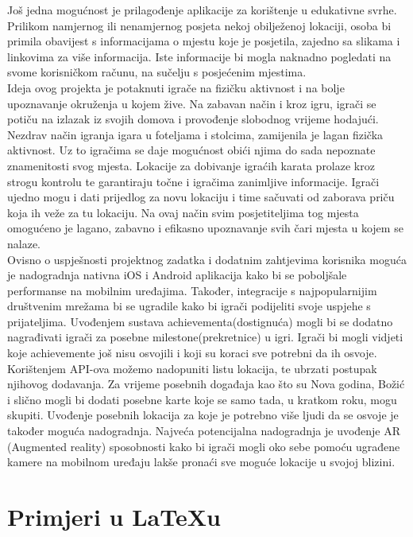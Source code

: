 		\textnormal{Još jedna mogućnost je prilagođenje aplikacije za korištenje u edukativne svrhe. Prilikom namjernog ili nenamjernog posjeta nekoj obilježenoj lokaciji, osoba bi primila obavijest s informacijama o mjestu koje je posjetila, zajedno sa slikama i linkovima za više informacija. Iste informacije bi mogla naknadno pogledati na svome korisničkom računu, na sučelju s posjećenim mjestima.}\\
		
		\textnormal{Ideja ovog projekta je potaknuti igrače na fizičku aktivnost i na bolje upoznavanje okruženja u kojem žive. Na zabavan način i kroz igru, igrači se potiču na izlazak iz svojih domova i provođenje slobodnog vrijeme hodajući. Nezdrav način igranja igara u foteljama i stolcima, zamijenila je lagan fizička aktivnost. Uz to igračima se daje mogućnost obići njima do sada nepoznate znamenitosti svog mjesta. Lokacije za dobivanje igraćih karata prolaze kroz strogu kontrolu te garantiraju točne i igračima zanimljive informacije. Igrači ujedno mogu i dati prijedlog za novu lokaciju i time sačuvati od zaborava priču koja ih veže za tu lokaciju. Na ovaj način svim posjetiteljima tog mjesta omogućeno je lagano, zabavno i efikasno upoznavanje svih čari mjesta u kojem se nalaze.}\\
		
		\textnormal{Ovisno o uspješnosti projektnog zadatka i dodatnim zahtjevima korisnika moguća je nadogradnja nativna iOS i Android aplikacija kako bi se poboljšale performanse na mobilnim uređajima. Također, integracije s najpopularnijim društvenim mrežama bi se ugradile kako bi igrači podijeliti svoje uspjehe s prijateljima. Uvođenjem sustava achievementa(dostignuća) mogli bi se dodatno nagrađivati igrači za posebne milestone(prekretnice) u igri. Igrači bi mogli vidjeti koje achievemente još nisu osvojili i koji su koraci sve potrebni da ih osvoje. Korištenjem API-ova možemo nadopuniti listu lokacija, te ubrzati postupak njihovog dodavanja. Za vrijeme posebnih događaja kao što su Nova godina, Božić i slično mogli bi dodati posebne karte koje se samo tada, u kratkom roku, mogu skupiti. Uvođenje posebnih lokacija za koje je potrebno više ljudi da se osvoje je također moguća nadogradnja. Najveća potencijalna nadogradnja je uvođenje AR (Augmented reality) sposobnosti kako bi igrači mogli oko sebe pomoću ugrađene kamere na mobilnom uređaju lakše pronaći sve moguće lokacije u svojoj blizini.}
		
		\eject
		
		\section{Primjeri u \LaTeX u}
		
